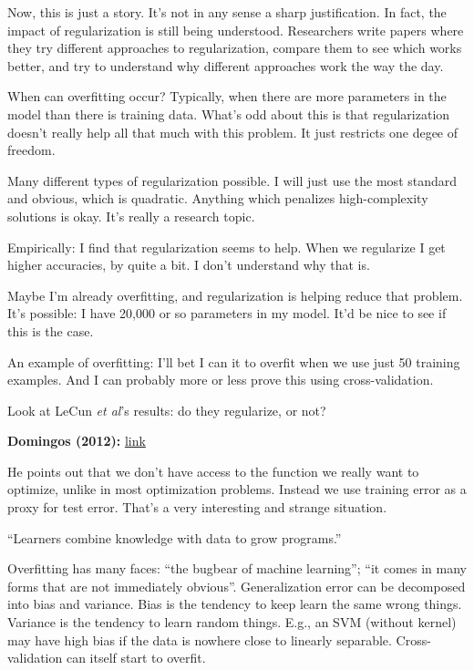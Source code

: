 \documentclass[12pt]{article}
\newcommand{\link}[2]{\href{#1}{#2}}
\begin{document}
Now, this is just a story.  It's not in any sense a sharp
justification.  In fact, the impact of regularization is still being
understood.  Researchers write papers where they try different
approaches to regularization, compare them to see which works better,
and try to understand why different approaches work the way the day.

When can overfitting occur?  Typically, when there are more parameters
in the model than there is training data.  What's odd about this is
that regularization doesn't really help all that much with this
problem.  It just restricts one degee of freedom.

Many different types of regularization possible.  I will just use the
most standard and obvious, which is quadratic.  Anything which
penalizes high-complexity solutions is okay.  It's really a research
topic.

Empirically: I find that regularization seems to help.  When we
regularize I get higher accuracies, by quite a bit.  I don't
understand why that is.

Maybe I'm already overfitting, and regularization is helping reduce
that problem.  It's possible: I have 20,000 or so parameters in my
model.  It'd be nice to see if this is the case.

An example of overfitting: I'll bet I can it to overfit when we use
just 50 training examples.  And I can probably more or less prove this
using cross-validation.

Look at LeCun \emph{et al}'s results: do they regularize, or not?

\textbf{Domingos (2012):} \link{http://scholar.google.ca/scholar?cluster=4404716649035182981\&hl=en\&as\_sdt=0,5}{link}

He points out that we don't have access to the function we really want
to optimize, unlike in most optimization problems.  Instead we use
training error as a proxy for test error.  That's a very interesting
and strange situation.

``Learners combine knowledge with data to grow programs.''

Overfitting has many faces: ``the bugbear of machine learning''; ``it
comes in many forms that are not immediately obvious''.
Generalization error can be decomposed into bias and variance.  Bias
is the tendency to keep learn the same wrong things.  Variance is the
tendency to learn random things.  E.g., an SVM (without kernel) may
have high bias if the data is nowhere close to linearly separable.
Cross-validation can itself start to overfit.
\end{document}
